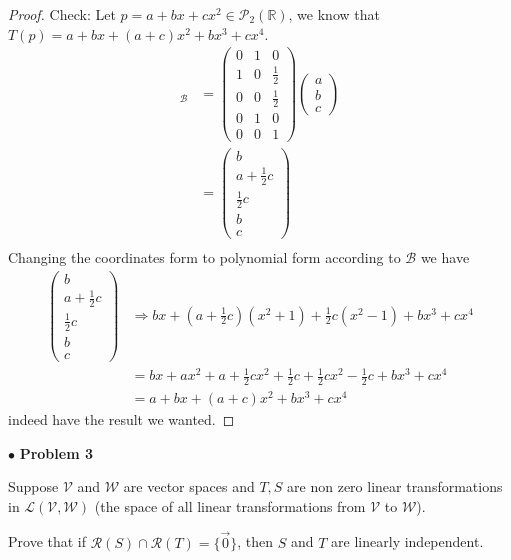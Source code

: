 \documentclass{article}
\begin{document}
\begin{proof}
Check: Let $p = a+bx+cx^2 \in \mathcal{P}_2(\mathbb{R})$, we know that $T(p) = a+bx+(a+c)x^2+bx^3+cx^4$.
\begin{align*}
[ T(p)]_{\mathcal{B}} &= \begin{pmatrix} 0 &1&0 \\ 1&0&\frac{1}{2} \\ 0&0&\frac{1}{2} \\ 0&1&0 \\0&0&1 \end{pmatrix} \begin{pmatrix} a \\ b\\c \end{pmatrix} \\
&= \begin{pmatrix} b \\ a+\frac{1}{2}c \\ \frac{1}{2}c \\ b \\ c \end{pmatrix} \\
\end{align*}
Changing the coordinates form to polynomial form according to $\mathcal{B}$ we have 
\begin{align*}
\begin{pmatrix} b \\ a+\frac{1}{2}c \\ \frac{1}{2}c \\ b \\ c \end{pmatrix} & \Rightarrow bx + (a+\frac{1}{2}c)(x^2+1) + \frac{1}{2}c(x^2-1) + bx^3 + cx^4 \\
&= bx + ax^2+a +\frac{1}{2}cx^2+\frac{1}{2}c + \frac{1}{2}cx^2-\frac{1}{2}c +bx^3 +cx^4 \\
&= a+ bx+(a+c)x^2+bx^3+cx^4
\end{align*}
indeed have the result we wanted.
\end{proof}

\newpage
$ \bullet$ \textbf{Problem 3}
\medskip

\begin{itshape}
Suppose $\mathcal{V}$ and $\mathcal{W}$ are vector spaces and $T,S$ are non zero linear transformations in $\mathcal{L}(\mathcal{V}, \mathcal{W})$ (the space of all linear transformations from $\mathcal{V}$ to $\mathcal{W}$). 

Prove that if $\mathcal{R}(S) \cap \mathcal{R}(T) = \{ \vec{0} \} $, then $S$ and $T$ are linearly independent.
\end{itshape}
\medskip
\end{document}
